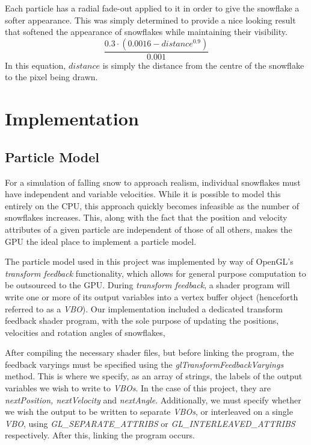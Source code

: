\documentclass[conference]{acmsiggraph}
\begin{document}
Each particle has a radial fade-out applied to it in order to give the snowflake a softer appearance. This was simply determined to provide a nice looking result that softened the appearance of snowflakes while maintaining their visibility.
\begin{equation} \label{eq:alpha}
\frac{0.3 \cdot (0.0016 - distance^{0.9})} {0.001}
\end{equation}
In this equation, $distance$ is simply the distance from the centre of the snowflake to the pixel being drawn.

\section{Implementation}

\subsection{Particle Model}
For a simulation of falling snow to approach realism, individual snowflakes must have independent and variable velocities. While it is possible to model this entirely on the CPU, this approach quickly becomes infeasible as the number of snowflakes increases. This, along with the fact that the position and velocity attributes of a given particle are independent of those of all others, makes the GPU the ideal place to implement a particle model.

The particle model used in this project was implemented by way of OpenGL's \textit{transform feedback} functionality, which allows for general purpose computation to be outsourced to the GPU. During \textit{transform feedback}, a shader program will write one or more of its output variables into a vertex buffer object (henceforth referred to as a \textit{VBO}). Our implementation included a dedicated transform feedback shader program, with the sole purpose of updating the positions, velocities and rotation angles of snowflakes, 

After compiling the necessary shader files, but before linking the program, the feedback varyings must be specified using the \textit{glTransformFeedbackVaryings} method. This is where we specify, as an array of strings, the labels of the output variables we wish to write to \textit{VBOs}. In the case of this project, they are \textit{nextPosition, nextVelocity} and \textit{nextAngle}. Additionally, we must specify whether we wish the output to be written to separate \textit{VBOs}, or interleaved on a single \textit{VBO}, using \textit{GL\_SEPARATE\_ATTRIBS} or \textit{GL\_INTERLEAVED\_ATTRIBS} respectively. After this, linking the program occurs.
\end{document}

